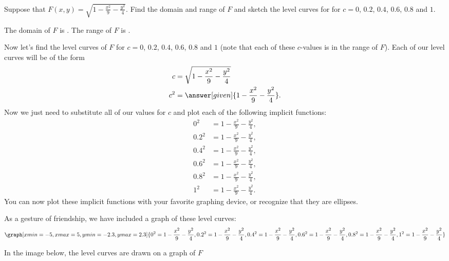 \documentclass{ximera}
\begin{document}
\begin{example}
  Suppose that $F(x,y) = \sqrt{1-\frac{x^2}{9}-\frac{y^2}{4}}$.  Find
  the domain and range of $F$ and sketch the level curves for for
  $c=0$, $0.2$, $0.4$, $0.6$, $0.8$ and $1$.
  \begin{explanation}
    The domain of $F$ is
    . 
    The range of $F$ is
    \wordChoice{
      \choice{$\R$}
      \choice{$\R^2$}
      \choice{$[0,\infty)$}
      \choice[correct]{$[0,1]$}
      }.

      Now let's find the level curves of $F$ for $c=0$, $0.2$, $0.4$,
      $0.6$, $0.8$ and $1$ (note that each of these $c$-values is in
      the range of $F$). Each of our level curves will be of the form
      \begin{align*}
        c &= \sqrt{1-\frac{x^2}{9}-\frac{y^2}{4}}\\
        c^2 &= \answer[given]{1-\frac{x^2}{9}-\frac{y^2}{4}}.
      \end{align*}
      Now we just need to substitute all of our values for $c$ and
      plot each of the following implicit functions:
    \begin{align*}
      0^2   &= 1-\frac{x^2}{9}-\frac{y^2}{4}, \\
      0.2^2 &= 1-\frac{x^2}{9}-\frac{y^2}{4}, \\
      0.4^2 &= 1-\frac{x^2}{9}-\frac{y^2}{4}, \\
      0.6^2 &= 1-\frac{x^2}{9}-\frac{y^2}{4}, \\
      0.8^2 &= 1-\frac{x^2}{9}-\frac{y^2}{4}, \\
        1^2 &= 1-\frac{x^2}{9}-\frac{y^2}{4}.   
    \end{align*}
    You can now plot these implicit functions with your favorite
    graphing device, or recognize that they are ellipses.
    \begin{onlineOnly}
      As a gesture of friendship, we have included a graph of these
      level curves:
      \[
      \graph[xmin=-5, xmax=5, ymin=-2.3, ymax=2.3]{0^2 = 1-\frac{x^2}{9}-\frac{y^2}{4}, 0.2^2 = 1-\frac{x^2}{9}-\frac{y^2}{4}, 0.4^2 = 1-\frac{x^2}{9}-\frac{y^2}{4},0.6^2 = 1-\frac{x^2}{9}-\frac{y^2}{4},0.8^2 = 1-\frac{x^2}{9}-\frac{y^2}{4},1^2 = 1-\frac{x^2}{9}-\frac{y^2}{4}}
      \]
    \end{onlineOnly}
    In the image below, the level curves are drawn on a graph of $F$

\end{explanation}
\end{example}
\end{document}
